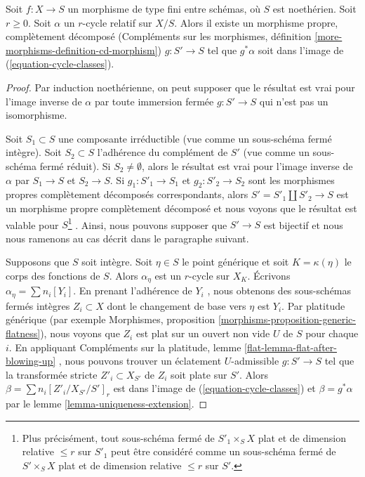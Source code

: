 \begin{lemma} 
\label{lemma-get-cycles} 
Soit  $f : X \to S$  un morphisme de type fini entre schémas, où $S$ est noethérien. 
Soit  $r \geq 0$. Soit  $\alpha$  un  $r$-cycle relatif sur $X/S$. Alors il existe un 
morphisme propre, complètement décomposé 
(Compléments sur les morphismes, définition  \ref{more-morphisms-definition-cd-morphism})
  $g : S' \to S$  tel que  $g^*\alpha$ soit dans l'image de 
(\ref{equation-cycle-classes}). 
\end{lemma} 

\begin{proof} 
Par induction noethérienne, on peut supposer que le résultat est vrai pour l'image inverse de 
$\alpha$  par toute immersion fermée  $g : S' \to S$  qui n'est pas un isomorphisme. 

\medskip\noindent
 Soit  $S_1 \subset S$  une composante irréductible (vue comme un sous-schéma fermé
 intègre). Soit  $S_2 \subset S$  l'adhérence du complément de  $S'$
  (vue comme un sous-schéma fermé réduit). Si  $S_2 \not = \emptyset$, alors
 le résultat est vrai pour l'image inverse de $\alpha$  par  $S_1 \to S$  et  $S_2 \to S$. 
Si  $g_1 : S'_1 \to S_1$ et  $g_2 : S'_2 \to S_2$
  sont les morphismes propres complètement décomposés correspondants, 
alors  $S' = S'_1 \amalg S'_2 \to S$
  est un morphisme propre complètement décomposé et nous 
voyons que le résultat est valable pour $S$\footnote{Plus précisément, tout 
sous-schéma fermé de $S'_1 \times_S X$ plat et de dimension relative  
$\leq r$  sur  $S'_1$  peut être considéré comme un sous-schéma fermé de  $S' \times_S X$
  plat et de dimension relative  $\leq r$  sur  $S'$.} 
. Ainsi, nous pouvons supposer que  $S' \to S$  est bijectif
 et nous nous ramenons au cas décrit dans le paragraphe suivant. 

\medskip\noindent
 Supposons que  $S$  soit intègre. Soit  $\eta \in S$  le point générique 
et soit  $K = \kappa(\eta)$  le corps des fonctions de  $S$. 
Alors  $\alpha_\eta$  est un  $r$-cycle sur  $X_K$. 
Écrivons  $\alpha_\eta = \sum n_i[Y_i]$.
 En prenant l'adhérence de  $Y_i$ , nous obtenons des sous-schémas fermés intègres 
$Z_i \subset X$  dont le changement de base vers  $\eta$  est  $Y_i$.
 Par platitude générique (par exemple Morphismes,
 proposition  \ref{morphisms-proposition-generic-flatness}), nous
 voyons que  $Z_i$  est plat sur un ouvert non vide  $U$  de  $S$  pour chaque  $i$. 
En appliquant Compléments sur la platitude, lemme \ref{flat-lemma-flat-after-blowing-up} , nous pouvons 
trouver un éclatement  $U$-admissible  $g : S' \to S$
 tel que la transformée stricte  $Z'_i \subset X_{S'}$
  de  $Z_i$  soit plate sur $S'$. Alors  $\beta = \sum n_i[Z'_i/X_{S'}/S']_r$
  est dans l'image de (\ref{equation-cycle-classes}) et $\beta = g^*\alpha$
  par le lemme \ref{lemma-uniqueness-extension}. 


\end{proof}

